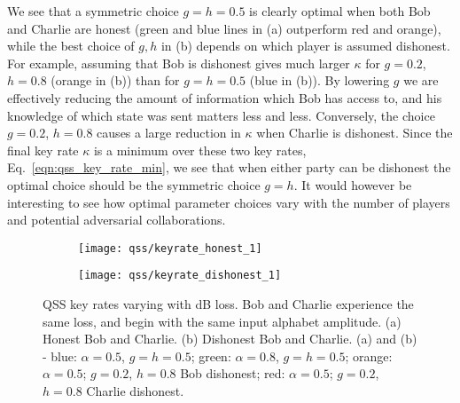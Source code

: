 We see that a symmetric choice $g = h = 0.5$ is clearly optimal when both Bob and Charlie are honest (green and blue lines in (a) outperform red and orange), while the best choice of $g, h$ in (b) depends on which player is assumed dishonest. For example, assuming that Bob is dishonest gives much larger $\kappa$ for $g=0.2$, $h=0.8$ (orange in (b)) than for $g = h = 0.5$ (blue in (b)). By lowering $g$ we are effectively reducing the amount of information which Bob has access to, and his knowledge of which state was sent matters less and less. Conversely, the choice $g=0.2$, $h=0.8$ causes a large reduction in $\kappa$ when Charlie is dishonest. Since the final key rate $\kappa$ is a minimum over these two key rates, Eq.~\ref{eqn:qss_key_rate_min}, we see that when either party can be dishonest the optimal choice should be the symmetric choice $g=h$. It would however be interesting to see how optimal parameter choices vary with the number of players and potential adversarial collaborations.



\begin{figure}[htp]
\captionsetup{width=\linewidth}
\centering
	\begin{subfigure}{0.7\linewidth}
	\centering
	\texttt{[image: qss/keyrate\_honest\_1]}
	\caption{}
	\end{subfigure}
	\begin{subfigure}{0.7\linewidth}
	\centering
	\texttt{[image: qss/keyrate\_dishonest\_1]}
	\caption{}
	\end{subfigure}
\caption{\label{fig:qss_keyrate} QSS key rates varying with dB loss. Bob and Charlie experience the same loss, and begin with the same input alphabet amplitude. (a) Honest Bob and Charlie. (b) Dishonest Bob and Charlie. (a) and (b) - blue: $\alpha=0.5$, $g=h=0.5$; green: $\alpha = 0.8$, $g = h = 0.5$; orange: $\alpha = 0.5$; $g = 0.2$, $h=0.8$ Bob dishonest; red: $\alpha = 0.5$; $g=0.2$, $h=0.8$ Charlie dishonest.}
\end{figure}


